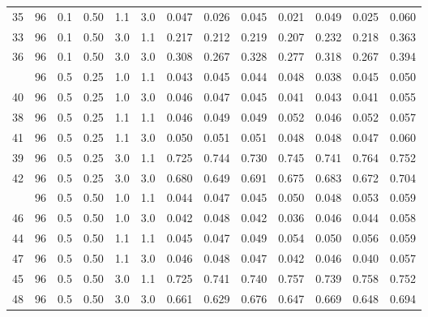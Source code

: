 \begin{longtable}[t]{ccccccrrrrrrc}
35 & 96 & 0.1 & 0.50 & 1.1 & 3.0 & 0.047 & 0.026 & 0.045 & 0.021 & 0.049 & 0.025 & 0.060\\
33 & 96 & 0.1 & 0.50 & 3.0 & 1.1 & 0.217 & 0.212 & 0.219 & 0.207 & 0.232 & 0.218 & 0.363\\
36 & 96 & 0.1 & 0.50 & 3.0 & 3.0 & 0.308 & 0.267 & 0.328 & 0.277 & 0.318 & 0.267 & 0.394\\
\addlinespace
37 & 96 & 0.5 & 0.25 & 1.0 & 1.1 & 0.043 & 0.045 & 0.044 & 0.048 & 0.038 & 0.045 & 0.050\\
40 & 96 & 0.5 & 0.25 & 1.0 & 3.0 & 0.046 & 0.047 & 0.045 & 0.041 & 0.043 & 0.041 & 0.055\\
38 & 96 & 0.5 & 0.25 & 1.1 & 1.1 & 0.046 & 0.049 & 0.049 & 0.052 & 0.046 & 0.052 & 0.057\\
41 & 96 & 0.5 & 0.25 & 1.1 & 3.0 & 0.050 & 0.051 & 0.051 & 0.048 & 0.048 & 0.047 & 0.060\\
39 & 96 & 0.5 & 0.25 & 3.0 & 1.1 & 0.725 & 0.744 & 0.730 & 0.745 & 0.741 & 0.764 & 0.752\\
42 & 96 & 0.5 & 0.25 & 3.0 & 3.0 & 0.680 & 0.649 & 0.691 & 0.675 & 0.683 & 0.672 & 0.704\\
\addlinespace
43 & 96 & 0.5 & 0.50 & 1.0 & 1.1 & 0.044 & 0.047 & 0.045 & 0.050 & 0.048 & 0.053 & 0.059\\
46 & 96 & 0.5 & 0.50 & 1.0 & 3.0 & 0.042 & 0.048 & 0.042 & 0.036 & 0.046 & 0.044 & 0.058\\
44 & 96 & 0.5 & 0.50 & 1.1 & 1.1 & 0.045 & 0.047 & 0.049 & 0.054 & 0.050 & 0.056 & 0.059\\
47 & 96 & 0.5 & 0.50 & 1.1 & 3.0 & 0.046 & 0.048 & 0.047 & 0.042 & 0.046 & 0.040 & 0.057\\
45 & 96 & 0.5 & 0.50 & 3.0 & 1.1 & 0.725 & 0.741 & 0.740 & 0.757 & 0.739 & 0.758 & 0.752\\
48 & 96 & 0.5 & 0.50 & 3.0 & 3.0 & 0.661 & 0.629 & 0.676 & 0.647 & 0.669 & 0.648 & 0.694\\
\bottomrule
\end{longtable}
\endgroup{}